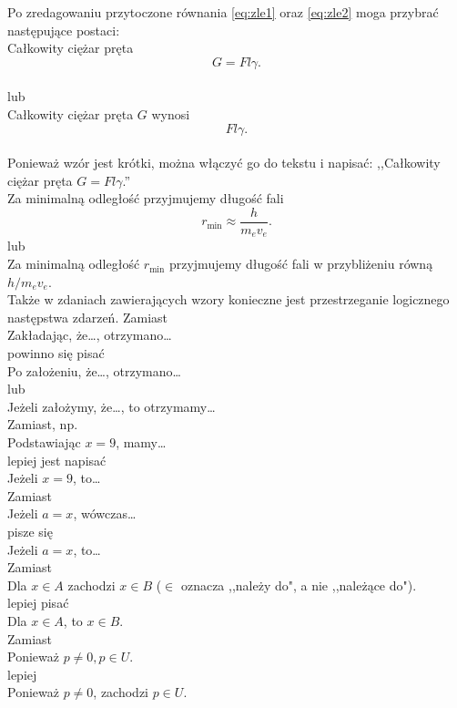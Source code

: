 Po zredagowaniu przytoczone równania \eqref{eq:zle1} oraz \eqref{eq:zle2} moga przybrać następujące postaci:\\
Całkowity ciężar pręta
\begin{equation*}
G = Fl\gamma.
\end{equation*}\\
lub\\
Całkowity ciężar pręta $G$ wynosi
\begin{equation*}
Fl\gamma.
\end{equation*}\\
Ponieważ wzór jest krótki, można włączyć go do tekstu i napisać: ,,Całkowity ciężar pręta $G =  Fl\gamma$.''\\
Za minimalną odległość przyjmujemy długość fali
\begin{equation*}
r_{\min} \approx \frac{h}{m_e v_e}.
\end{equation*}
lub\\
Za minimalną odległość $r_{\min}$ przyjmujemy długość fali w przybliżeniu równą $h \slash m_e v_e$.\\


Także w zdaniach zawierających wzory konieczne jest przestrzeganie logicznego następstwa zdarzeń.
Zamiast\\
\hspace*{2cm}Zakładając, że\dots, otrzymano\dots\\
powinno się pisać\\
\hspace*{2cm}Po założeniu, że\dots, otrzymano\dots\\
lub\\
\hspace*{2cm}Jeżeli założymy, że\dots, to otrzymamy\dots\\
Zamiast, np.\\
\hspace*{2cm}Podstawiając $x=9$, mamy\dots\\
lepiej jest napisać\\
\hspace*{2cm}Jeżeli $x=9$, to\dots\\
Zamiast\\
\hspace*{2cm}Jeżeli $a=x$, wówczas\dots\\
pisze się\\
\hspace*{2cm}Jeżeli $a=x$, to\dots\\
Zamiast\\
\hspace*{2cm}Dla $x\in A$ zachodzi $x\in B$ ($\in$ oznacza ,,należy do", a nie ,,należące do").\\
lepiej pisać\\
\hspace*{2cm}Dla $x\in A$, to $x\in B$.\\
Zamiast\\
\hspace*{2cm}Ponieważ $p\neq 0, p\in U$.\\
lepiej\\
\hspace*{2cm}Ponieważ  $p\neq 0$, zachodzi $p\in U$.



